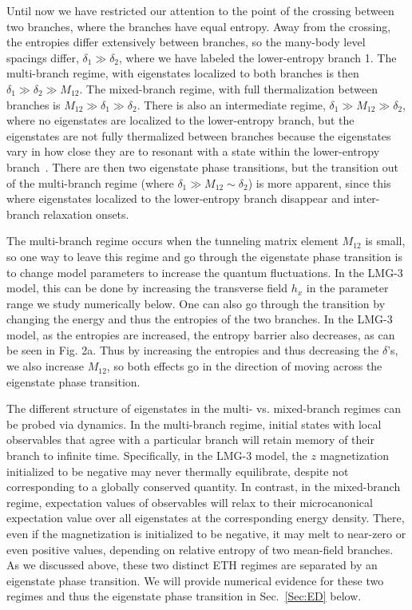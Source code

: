 \documentclass[aps,prx,showpacs,amsmath,amssymb,superscriptaddress,twocolumn,longbibliography,10pt,nofootinbib]{revtex4-2}
\begin{document}
Until now we have restricted our attention to the point of the crossing between two branches, where the branches have equal entropy.  Away from the crossing, the entropies differ extensively between branches, so the many-body level spacings differ, $\delta_1\gg\delta_2$, where we have labeled the lower-entropy branch 1.  The multi-branch regime, with eigenstates localized to both branches is then $\delta_1 \gg\delta_2 \gg M_{12}$. The mixed-branch regime, with full thermalization between branches is $M_{12}\gg\delta_1\gg\delta_2$.  There is also an intermediate regime, $\delta_1\gg M_{12}\gg\delta_2$, where no eigenstates are localized to the lower-entropy branch, but the eigenstates are not fully thermalized between branches because the eigenstates vary in how close they are to resonant with a state within the lower-entropy branch~\cite{Morningstar23}. There are then two eigenstate phase transitions, but the transition out of the multi-branch regime (where $\delta_1 \gg M_{12}\sim  \delta_2$) is more apparent, since this where eigenstates localized to the lower-entropy branch disappear and inter-branch relaxation onsets.

The multi-branch regime occurs when the tunneling matrix element $M_{12}$ is small, so one way to leave this regime and go through the eigenstate phase transition is to change model parameters to increase the quantum fluctuations.  In the LMG-3 model, this can be done by increasing the transverse field $h_x$ in the parameter range we study numerically below.  One can also go through the transition by changing the energy and thus the entropies of the two branches.  In the LMG-3 model, as the entropies are increased, the entropy barrier also decreases, as can be seen in Fig. 2a.  Thus by increasing the entropies and thus decreasing the $\delta$'s, we also increase $M_{12}$, so both effects go in the direction of moving across the eigenstate phase transition.

The different structure of eigenstates in the multi- vs. mixed-branch regimes can be probed via dynamics. In the multi-branch regime, initial states with local observables that agree with a particular branch will retain memory of their branch to infinite time.  Specifically, in the LMG-3 model, the $z$ magnetization initialized to be negative may never thermally equilibrate, despite not corresponding to a globally conserved quantity.  In contrast, in the mixed-branch regime, expectation values of observables will relax to their microcanonical expectation value over all eigenstates at the corresponding energy density. There, even if the magnetization is initialized to be negative, it may melt to near-zero or even positive values, depending on relative entropy of two mean-field branches. As we discussed above, these two distinct ETH regimes are separated by an eigenstate phase transition. We will provide numerical evidence for these two regimes and thus the eigenstate phase transition in Sec.~\ref{Sec:ED} below. 
\end{document}
